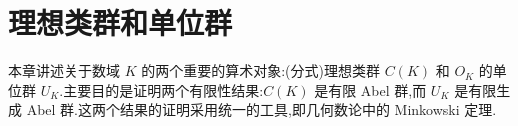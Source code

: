 \chapter{理想类群和单位群}\label{ch:3}

本章讲述关于数域 $K$ 的两个重要的算术对象:(分式)理想类群 $C(K)$ 和 $O_K$ 的单位群 $U_K$.主要目的是证明两个有限性结果:$C(K)$ 是有限 Abel 群,而 $U_K$ 是有限生成 Abel 群.这两个结果的证明采用统一的工具,即几何数论中的 Minkowski 定理.



